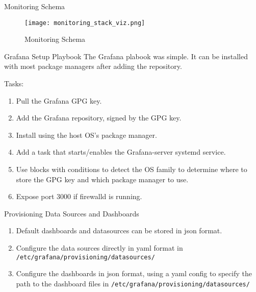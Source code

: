 \documentclass[14pt,compress,usenames,dvipsnames,aspectratio=169]{beamer}
\begin{document}
\begin{frame}{Monitoring Schema}
    \begin{figure}
        \centering
        \texttt{[image: monitoring\_stack\_viz.png]}
        \caption{Monitoring Schema}
        \label{fig:enter-label}
    \end{figure} 
\end{frame}





\begin{frame}{Grafana Setup Playbook}
The Grafana plabook was simple. It can be installed with most package managers after
    adding the repository.  
 
    Tasks:
    \begin{enumerate}
        \item{Pull the Grafana GPG key.} 
        \item{Add the Grafana repository, signed by the GPG key.}
        \item{Install using the host OS's package manager.}
        \item{Add a task that starts/enables the Grafana-server systemd service.}
        \item{Use blocks with conditions to detect the OS family to determine where
            to store the GPG key and which package manager to use.}
        \item{Expose port 3000 if firewalld is running.}
    \end{enumerate}
\end{frame}


\begin{frame}{Provisioning Data Sources and Dashboards}
    \begin{enumerate}
        \item{Default dashboards and datasources can be stored in json format.}
        \item{Configure the data sources directly in yaml format in
            \texttt{/etc/grafana/provisioning/datasources/} }
        \item{Configure the dashboards in json format, using a yaml config to 
                specify the path to the dashboard files in 
                \texttt{/etc/grafana/provisioning/datasources/} }
 
    \end{enumerate}
\end{frame}
\end{document}
